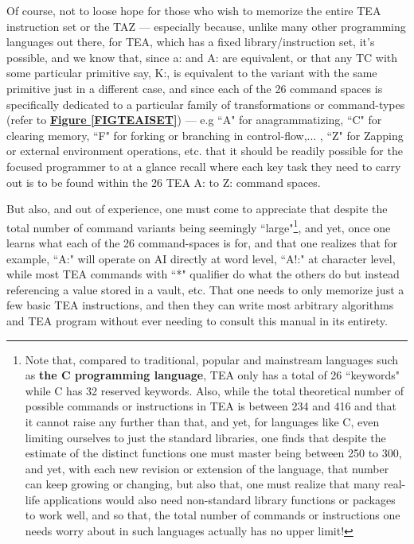 \documentclass[a4paper, 18pt]{book} %
\begin{document}
Of course, not to loose hope for those who wish to memorize the entire TEA instruction set or the TAZ --- especially because, unlike many other programming languages out there, for TEA, which has a fixed library/instruction set, it's possible, and we know that, since a: and A: are equivalent, or that any TC with some particular primitive say, K:, is equivalent to the variant with the same primitive just in a different case, and since each of the 26 command spaces is specifically dedicated to a particular family of transformations or command-types (refer to \textbf{\hyperref[FIGTEAISET]{Figure \ref{FIGTEAISET}}}) --- e.g ``A" for anagrammatizing, ``C" for clearing memory, ``F" for forking or branching in control-flow,... , ``Z" for Zapping or external environment operations, etc. that it should be readily possible for the focused programmer to at a glance recall where each key task they need to carry out is to be found within the 26 TEA A: to Z: command spaces. 

\vspace{2em}


But also, and out of experience, one must come to appreciate that despite the total number of command variants being seemingly ``large"\footnote{Note that, compared to traditional, popular and mainstream languages such as \textbf{the C programming language}, TEA only has a total of 26 ``keywords" while C has 32 reserved keywords\cite{copilot_assistant}. Also, while the total theoretical number of possible commands or instructions in TEA is between 234 and 416 and that it cannot raise any further than that, and yet, for languages like C, even limiting ourselves to just the standard libraries, one finds that despite the estimate of the distinct functions one must master being between 250 to 300\cite{copilot_assistant}, and yet, with each new revision or extension of the language, that number can keep growing or changing, but also that, one must realize that many real-life applications would also need non-standard library functions or packages to work well, and so that, the total number of commands or instructions one needs worry about in such languages actually has no upper limit!}, and yet, once one learns what each of the 26 command-spaces is for, and that one realizes that for example, ``A:" will operate on AI directly at word level, ``A!:" at character level, while most TEA commands with ``*" qualifier do what the others do but instead referencing a value stored in a vault, etc. That one needs to only memorize just a few basic TEA instructions, and then they can write most arbitrary algorithms and TEA program without ever needing to consult this manual in its entirety.
\end{document}
